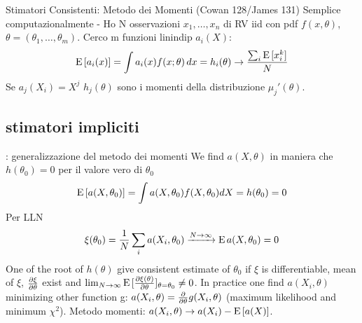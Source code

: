 \documentclass[asd-beamer.tex]{subfiles}
\begin{document}
\begin{frame}{Stimatori Consistenti: Metodo dei Momenti (Cowan 128/James 131)}\frameintoc
Semplice computazionalmente - Ho N osservazioni $x_1,\ldots,x_n$ di RV iid con pdf $f(x,\theta)$, $\theta=(\theta_1,\ldots,\theta_m)$. Cerco m funzioni linindip $a_i(X)$:
\[\operatorname{E}{[a_i(x)]}=\int a_i(x)f(x;\theta)\,dx=h_i(\theta)\to\frac{\sum_i\operatorname{E}{[x_i^k]}}{N}\]
Se $a_j(X_i)=X^j$ $h_j(\theta)$ sono i momenti della distribuzione $\mu_j'(\theta)$.
\end{frame}

\subsection{stimatori impliciti}

\begin{frame}{: generalizzazione del metodo dei momenti}
We find $a(X,\theta)$ in maniera che $h(\theta_0)=0$ per il valore vero di $\theta_0$
\[\operatorname{E}{[a(X,\theta_0)]}=\int a(X,\theta_0)f(X,\theta_0)dX=h(\theta_0)=0\]
Per LLN \[\xi(\theta_0)=\frac{1}{N}\sum_ia(X_i,\theta_0)\xrightarrow{N\to\infty}\operatorname{E}{a(X,\theta_0)}=0\]
One of the root of $h(\theta)$ give consistent estimate of $\theta_0$ if $\xi$ is differentiable, mean of $\xi$, $\frac{\partial \xi}{\partial \theta}$ exist and $\lim_{N\to\infty}\operatorname{E}{[\frac{\partial \xi(\theta)}{\partial \theta}]_{\theta=\theta_0}}\neq0$.
In practice one find $a(X_i,\theta)$ minimizing other function g: $a(X_i,\theta)=\frac{\partial}{\partial \theta}g(X_i,\theta)$ (maximum likelihood and minimum $\chi^2$).
Metodo momenti: $a(X_i,\theta)\to a(X_i)-\operatorname{E}{[a(X)]}$.
\end{frame}
\end{document}
